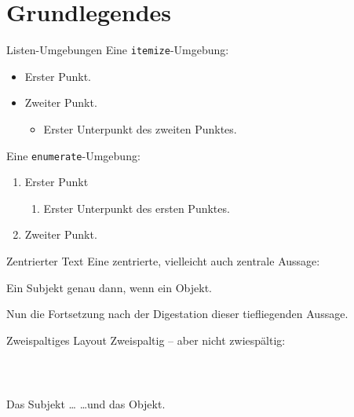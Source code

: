 \section{Grundlegendes}

\begin{frame}{Listen-Umgebungen}
    Eine \texttt{itemize}-Umgebung:
    \begin{itemize}
        \item Erster Punkt.
        \item Zweiter Punkt.
              \begin{itemize}
                  \item Erster Unterpunkt des zweiten Punktes.
              \end{itemize}
    \end{itemize}

    Eine \texttt{enumerate}-Umgebung:

    \begin{enumerate}
        \item Erster Punkt
              \begin{enumerate}
                  \item Erster Unterpunkt des ersten Punktes.
              \end{enumerate}
        \item Zweiter Punkt.
    \end{enumerate}
\end{frame}

\begin{frame}{Zentrierter Text}
    Eine zentrierte, vielleicht auch zentrale Aussage:
    \begin{center}
        Ein Subjekt genau dann, wenn ein Objekt.
    \end{center}
    \pause\par%
    Nun die Fortsetzung nach der Digestation dieser tiefliegenden Aussage.
\end{frame}

\begin{frame}{Zweispaltiges Layout}
    Zweispaltig – aber nicht zwiespältig:
    \par{}~%
    \begin{columns}
         Das Subjekt \dots
         \dots und das Objekt.
    \end{columns}
\end{frame}

